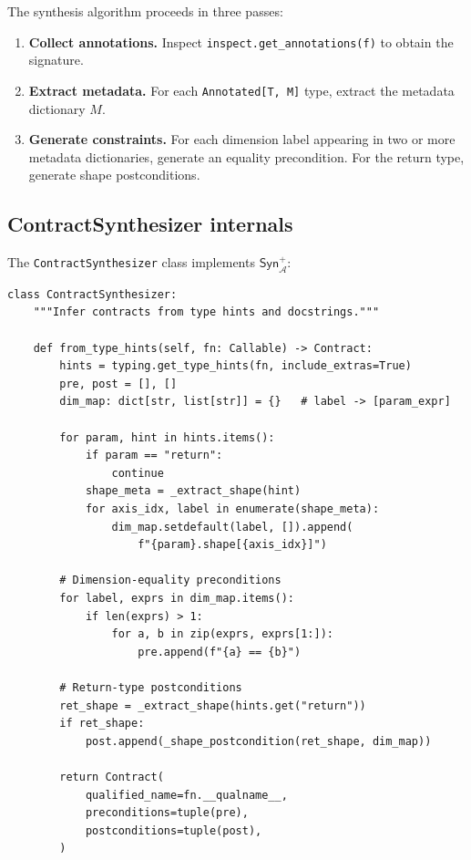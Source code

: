 \documentclass[11pt]{article}
\newcommand{\Syn}{\mathsf{Syn}}            %
\newcommand{\TypeAnn}{\mathcal{A}}         %
\newcommand{\SynT}{\Syn_{\TypeAnn}}        %
\begin{document}
The synthesis algorithm proceeds in three passes:

\begin{enumerate}[label=(\arabic*)]
  \item \textbf{Collect annotations.}  Inspect
    \texttt{inspect.get\_annotations(f)} to obtain the signature.
  \item \textbf{Extract metadata.}  For each \texttt{Annotated[T, M]}
    type, extract the metadata dictionary $M$.
  \item \textbf{Generate constraints.}  For each dimension label
    appearing in two or more metadata dictionaries, generate an
    equality precondition.  For the return type, generate shape
    postconditions.
\end{enumerate}

\subsection{ContractSynthesizer internals}

The \texttt{ContractSynthesizer} class implements $\SynT^+$:

\begin{lstlisting}[style=jugeo-python,
  caption={\texttt{ContractSynthesizer}: core synthesis loop.}]
class ContractSynthesizer:
    """Infer contracts from type hints and docstrings."""

    def from_type_hints(self, fn: Callable) -> Contract:
        hints = typing.get_type_hints(fn, include_extras=True)
        pre, post = [], []
        dim_map: dict[str, list[str]] = {}   # label -> [param_expr]

        for param, hint in hints.items():
            if param == "return":
                continue
            shape_meta = _extract_shape(hint)
            for axis_idx, label in enumerate(shape_meta):
                dim_map.setdefault(label, []).append(
                    f"{param}.shape[{axis_idx}]")

        # Dimension-equality preconditions
        for label, exprs in dim_map.items():
            if len(exprs) > 1:
                for a, b in zip(exprs, exprs[1:]):
                    pre.append(f"{a} == {b}")

        # Return-type postconditions
        ret_shape = _extract_shape(hints.get("return"))
        if ret_shape:
            post.append(_shape_postcondition(ret_shape, dim_map))

        return Contract(
            qualified_name=fn.__qualname__,
            preconditions=tuple(pre),
            postconditions=tuple(post),
        )
\end{lstlisting}
\end{document}
